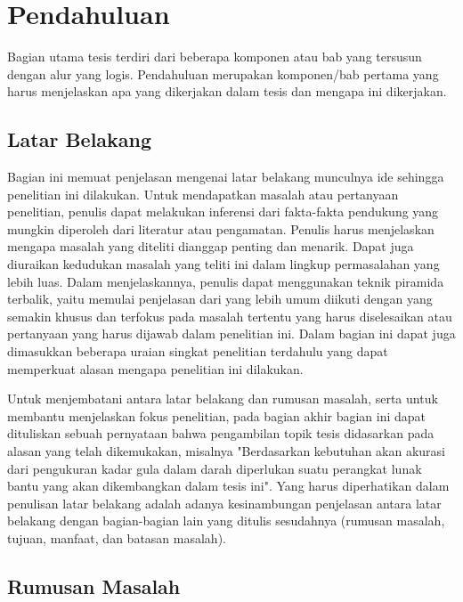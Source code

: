 \newpage
{}
\setcounter{page}{1}


\chapter{Pendahuluan}


Bagian utama tesis terdiri dari beberapa komponen atau bab yang tersusun dengan alur yang logis. Pendahuluan merupakan komponen/bab pertama yang harus menjelaskan apa yang dikerjakan dalam tesis dan mengapa ini dikerjakan. 

\section{Latar Belakang}

Bagian ini memuat penjelasan mengenai latar belakang munculnya ide sehingga penelitian ini dilakukan. Untuk mendapatkan masalah atau pertanyaan penelitian, penulis dapat melakukan inferensi dari fakta-fakta pendukung yang mungkin diperoleh dari literatur atau pengamatan. Penulis harus menjelaskan mengapa masalah yang diteliti dianggap penting dan menarik. Dapat juga diuraikan kedudukan masalah yang teliti ini dalam lingkup permasalahan yang lebih luas. Dalam menjelaskannya, penulis dapat menggunakan teknik piramida terbalik, yaitu memulai penjelasan dari yang lebih umum diikuti dengan yang semakin khusus dan terfokus pada masalah tertentu yang harus diselesaikan atau pertanyaan yang harus dijawab dalam penelitian ini. Dalam bagian ini dapat juga dimasukkan beberapa uraian singkat penelitian terdahulu yang dapat memperkuat alasan mengapa penelitian ini dilakukan. 

Untuk menjembatani antara latar belakang dan rumusan masalah, serta untuk membantu menjelaskan fokus penelitian, pada bagian akhir bagian ini dapat dituliskan sebuah pernyataan bahwa pengambilan topik tesis didasarkan pada alasan yang telah dikemukakan, misalnya "Berdasarkan kebutuhan akan akurasi dari pengukuran kadar gula dalam darah diperlukan suatu perangkat lunak bantu yang akan dikembangkan dalam tesis ini". Yang harus diperhatikan dalam penulisan latar belakang adalah adanya kesinambungan penjelasan antara latar belakang dengan bagian-bagian lain yang ditulis sesudahnya (rumusan masalah, tujuan, manfaat, dan batasan masalah).


\section{Rumusan Masalah}

